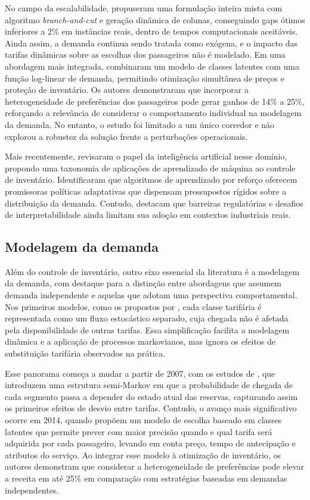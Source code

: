 No campo da escalabilidade, \citet{MENDEZDIAZ2014} propuseram uma formulação inteira mista com algoritmo \textit{branch-and-cut} e geração dinâmica de colunas, conseguindo gaps ótimos inferiores a 2\% em instâncias reais, dentro de tempos computacionais aceitáveis. Ainda assim, a demanda continua sendo tratada como exógena, e o impacto das tarifas dinâmicas sobre as escolhas dos passageiros não é modelado. Em uma abordagem mais integrada, \citet{HETRAKUL201468} combinaram um modelo de classes latentes com uma função log-linear de demanda, permitindo otimização simultânea de preços e proteção de inventário. Os autores demonstraram que incorporar a heterogeneidade de preferências dos passageiros pode gerar ganhos de 14\% a 25\%, reforçando a relevância de considerar o comportamento individual na modelagem da demanda. No entanto, o estudo foi limitado a um único corredor e não explorou a robustez da solução frente a perturbações operacionais.

Mais recentemente, \citet{Besinovic2022} revisaram o papel da inteligência artificial nesse domínio, propondo uma taxonomia de aplicações de aprendizado de máquina ao controle de inventário. Identificaram que algoritmos de aprendizado por reforço oferecem promissoras políticas adaptativas que dispensam pressupostos rígidos sobre a distribuição da demanda. Contudo, destacam que barreiras regulatórias e desafios de interpretabilidade ainda limitam sua adoção em contextos industriais reais.

\subsection{Modelagem da demanda}

Além do controle de inventário, outro eixo essencial da literatura é a modelagem da demanda, com destaque para a distinção entre abordagens que assumem demanda independente e aquelas que adotam uma perspectiva comportamental. Nos primeiros modelos, como os propostos por \citet{Dana1999, Feng2001}, cada classe tarifária é representada como um fluxo estocástico separado, cuja chegada não é afetada pela disponibilidade de outras tarifas. Essa simplificação facilita a modelagem dinâmica e a aplicação de processos markovianos, mas ignora os efeitos de substituição tarifária observados na prática.

Esse panorama começa a mudar a partir de 2007, com os estudos de \citet{Walczak2007}, que introduzem uma estrutura semi-Markov em que a probabilidade de chegada de cada segmento passa a depender do estado atual das reservas, capturando assim os primeiros efeitos de desvio entre tarifas. Contudo, o avanço mais significativo ocorre em 2014, quando \citet{HETRAKUL201468} propõem um modelo de escolha baseado em classes latentes que permite prever com maior precisão quando e qual tarifa será adquirida por cada passageiro, levando em conta preço, tempo de antecipação e atributos do serviço. Ao integrar esse modelo à otimização de inventário, os autores demonstram que considerar a heterogeneidade de preferências pode elevar a receita em até 25\% em comparação com estratégias baseadas em demandas independentes.

